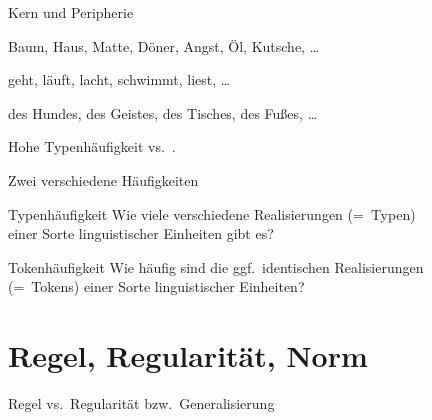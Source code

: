 \begin{frame}
  {Kern und Peripherie}
  \pause
\begin{exe}
  \ex\label{ex:kernundperipherie022}
    \begin{xlist}
      \ex \alert{Baum, Haus, Matte, Döner, Angst, Öl, Kutsche, \ldots}
      \ex {}
    \end{xlist}
    \pause
    \ex
    \begin{xlist}
      \ex \alert{geht, läuft, lacht, schwimmt, liest, \ldots}
      \ex {}
    \end{xlist}
    \pause
    \ex
    \begin{xlist}
      \ex \alert{des Hundes, des Geistes, des Tisches, des Fußes, \ldots}
      \ex {}
    \end{xlist}
  \end{exe}
  \pause
  \vspace{\baselineskip}
  \Large
  \centering
  \alert{Hohe Typenhäufigkeit} vs.\ .  
\end{frame}

\begin{frame}
  {Zwei verschiedene Häufigkeiten}
  \pause
  \Large\begin{block}{Typenhäufigkeit}
    Wie viele \alert{verschiedene} Realisierungen (=~Typen)\\
    einer Sorte linguistischer Einheiten gibt es?
  \end{block}

  \pause
  \vspace{\baselineskip}
  
  \begin{block}{Tokenhäufigkeit}
    Wie häufig sind die \alert{ggf.\ identischen} Realisierungen\\
    (=~Tokens) einer Sorte linguistischer Einheiten?
  \end{block}
\end{frame}


\section{Regel, Regularität, Norm}

\begin{frame}
  {Regel vs.\ Regularität bzw.\ Generalisierung}
  \pause
  \begin{exe}
    \ex
    \begin{xlist}
      \pause
      \pause
      \pause
      \pause
    \end{xlist}
  \end{exe}
\end{frame}


